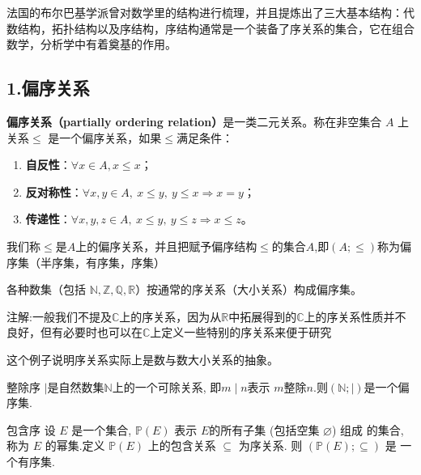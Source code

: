 
\begin{issues}
\issueAbstract
\end{issues}


法国的布尔巴基学派曾对数学里的结构进行梳理，并且提炼出了三大基本结构：代数结构，拓扑结构以及序结构，序结构通常是一个装备了序关系的集合，它在组合数学，分析学中有着奠基的作用。

\subsection{1.偏序关系}
\textbf{偏序关系（partially ordering relation）}是一类二元关系。称在非空集合 $A$ 上关系$\leq$ 是一个偏序关系，如果$\leq$满足条件：
\begin{enumerate}
\item \textbf{自反性}：$\forall x\in A,x\leq x$；
\item \textbf{反对称性}：$\forall x,y\in A,\ x\leq y,\ y\leq x \Rightarrow x = y $；
\item \textbf{传递性}：$\forall x,y,z\in A,\ x\leq y,\ y\leq z \Rightarrow x\leq z $。
\end{enumerate}
我们称$\leq$是$A$上的偏序关系，并且把赋予偏序结构$\leq$的集合$A$,即$(A;\leq)$称为偏序集（半序集，有序集，序集）
\begin{example}{}
各种数集（包括 $\mathbb{N},\mathbb{Z},\mathbb{Q},\mathbb{R}$）按通常的序关系（大小关系）构成偏序集。

注解:一般我们不提及$\mathbb{C}$上的序关系，因为从$\mathbb{R}$中拓展得到的$\mathbb{C}$上的序关系性质并不良好，但有必要时也可以在$\mathbb{C}$上定义一些特别的序关系来便于研究
\end{example}

这个例子说明序关系实际上是数与数大小关系的抽象。

\begin{example}{整除序}
$\mid$是自然数集$\mathbb{N}$上的一个可除关系, 即$m \mid n$表示 $ m$整除$n$.则$(\mathbb{N};\mid)$是一个偏序集.
\end{example}

\begin{example}{包含序}
设  $E$  是一个集合,  $\mathbb{P}(E)$  表示 $ E  $的所有子集 (包括空集 $ \varnothing  $) 组成 的集合, 称为 $ E $ 的幂集.定义  $\mathbb{P}(E)$  上的包含关系  $\subseteq $ 为序关系. 则  $(\mathbb{P}(E) ; \subseteq) $ 是 一个有序集.
\end{example}

